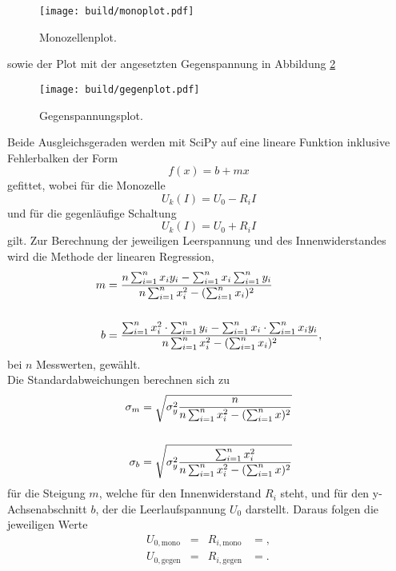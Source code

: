 \begin{figure}[H]
  \centering
  \texttt{[image: build/monoplot.pdf]}
  \caption{Monozellenplot.}
  \label{fig:1}
\end{figure}

sowie der Plot mit der angesetzten Gegenspannung in Abbildung \ref{fig:2}

\begin{figure}[H]
  \centering
  \texttt{[image: build/gegenplot.pdf]}
  \caption{Gegenspannungsplot.}
  \label{fig:2}
\end{figure}

Beide Ausgleichsgeraden werden mit SciPy auf eine lineare Funktion inklusive Fehlerbalken der Form
\begin{equation}
  f(x) = b + mx
  \label{eqn:mxb}
\end{equation}
gefittet, wobei für die Monozelle
\begin{equation}
  U_k(I) = U_0 - R_iI
    \label{eqn:uk}
\end{equation}
und für die gegenläufige Schaltung
\begin{equation}
  U_k(I) = U_0 + R_iI
\end{equation}
gilt.
Zur Berechnung der jeweiligen Leerspannung und des Innenwiderstandes wird die Methode der linearen Regression,
\begin{align}
  m &= \frac{ n \sum_{i=1}^n x_i y_i - \sum_{i=1}^n x_i \sum_{i=1}^n y_i }{n\sum_{i=1}^n x_i^2 - ( \sum_{i=1}^n x_i )^2}  \label{eqn:2}\\
  \notag\\
  b &= \frac{ \sum_{i=1}^n x_i^2 \cdot \sum_{i=1}^n y_i - \sum_{i=1}^n x_i \cdot \sum_{i=1}^n x_i y_i}{n\sum_{i=1}^n x_i^2 - ( \sum_{i=1}^n x_i )^2},
  \label{eqn:3}
\end{align}
bei $n$ Messwerten, gewählt.
\\
Die Standardabweichungen berechnen sich zu
\begin{align}
  \sigma_m &= \sqrt{ \sigma_y^2 \frac{n}{n \sum_{i=1}^n x_i^2 - (\sum_{i=1}^n x)^2} }
  \label{eqn:4}\\
  \notag\\
  \sigma_b &= \sqrt{ \sigma_y^2 \frac{\sum_{i=1}^n x_i^2}{n \sum_{i=1}^n x_i^2 - (\sum_{i=1}^n x)^2} }
  \label{eqn:5}
\end{align}
für die Steigung $m$, welche für den Innenwiderstand $R_i$ steht, und für den y-Achsenabschnitt $b$, der die Leerlaufspannung $U_0$ darstellt.\cite{fehler}
Daraus folgen die jeweiligen Werte
\begin{align*}
  U_{0,{\text{mono}}}  &=   & R_{i,\text{mono}}  &= ,\\
  U_{0,{\text{gegen}}} &=  & R_{i,\text{gegen}} &= .
\end{align*}

